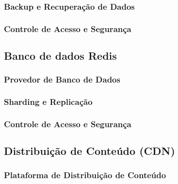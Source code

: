 \subsubsection{Backup e Recuperação de Dados}

\subsubsection{Controle de Acesso e Segurança}

\subsection{Banco de dados Redis}

\subsubsection{Provedor de Banco de Dados}

\subsubsection{Sharding e Replicação}

\subsubsection{Controle de Acesso e Segurança}



\subsection{Distribuição de Conteúdo (CDN)}

\subsubsection{Plataforma de Distribuição de Conteúdo}

